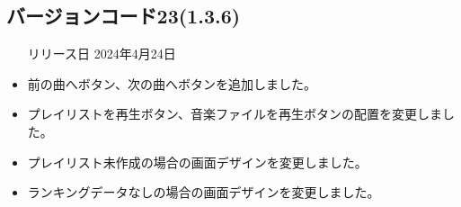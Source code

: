 \subsection*{バージョンコード23(1.3.6)}
\begin{itemize}
    \item[リリース日] 2024年4月24日
\end{itemize}

\new
\begin{itemize}
    \item 前の曲へボタン、次の曲へボタンを追加しました。
\end{itemize}

\change
\begin{itemize}
    \item プレイリストを再生ボタン、音楽ファイルを再生ボタンの配置を変更しました。
    \item プレイリスト未作成の場合の画面デザインを変更しました。
    \item ランキングデータなしの場合の画面デザインを変更しました。
\end{itemize}

\fix
